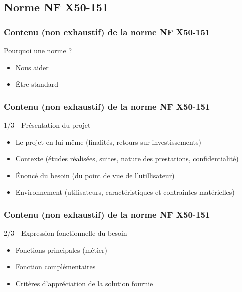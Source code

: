 \subsection{Norme NF X50-151}

\begin{frame}
\tableofcontents[subsectionstyle=show/shaded/hide, subsubsectionstyle=hide, sectionstyle=show/hide]
\end{frame}

\begin{frame}
\frametitle{Contenu (non exhaustif) de la norme NF X50-151}

\begin{block}{Pourquoi une norme ?}
\begin{itemize}
    \item Nous aider
    \item Être \og{}standard\fg{}
\end{itemize}

\end{block}
\end{frame}

\begin{frame}
\frametitle{Contenu (non exhaustif) de la norme NF X50-151}
\begin{exampleblock}{1/3 - Présentation du projet}
\begin{itemize}
    \item Le projet en lui même \small(finalités, retours sur investissements)
    \item Contexte \small(études réalisées, suites, nature des prestations, confidentialité)
    \item Énoncé du besoin \small(du point de vue de l'utillisateur)
    \item Environnement \small(utilisateurs, caractéristiques et contraintes matérielles)
\end{itemize}
\end{exampleblock}
\end{frame}

\begin{frame}
\frametitle{Contenu (non exhaustif) de la norme NF X50-151}
\begin{exampleblock}{2/3 - Expression fonctionnelle du besoin}
\begin{itemize}
    \item Fonctions principales (métier)
    \item Fonction complémentaires
    \item Critères d'appréciation de la solution fournie
\end{itemize}
\end{exampleblock}

\end{frame}

